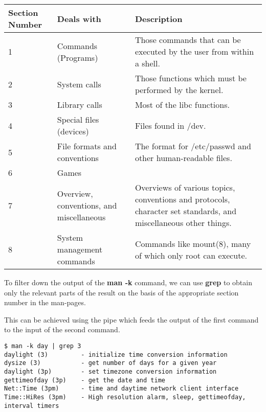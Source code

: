 \vspace{-5pt}
\noindent
\begin{tabular}{p{}p{}p{}}
	\toprule
	Section Number & Deals with & Description \\
	\midrule
	1 & Commands (Programs) & Those  commands  that  can  be executed  by the user from within a	shell. \\
	2 & System calls & Those functions which must be performed by the kernel. \\		
	3 & Library calls & Most of the libc functions. \\		
	4 & Special files (devices) & Files found in /dev. \\		
	5 & File formats and conventions & The format for /etc/passwd and other human-readable files. \\		
	6 & Games & \\		
	7 & Overview, conventions, and miscellaneous & Overviews of various topics, conventions and  protocols,  character set standards, and miscellaneous other things. \\		
	8 & System management commands & Commands like mount(8), many of which only root can execute.	\\
	\bottomrule
\end{tabular}

\noindent
To filter down the output of the \textbf{man -k} command, we can use \textbf{grep} to obtain only the relevant parts of the result on the basis of the appropriate section number in the man-pages. 

\noindent
This can be achieved using the pipe which feeds the output of the first command to the input of the second command. 

\vspace{-20pt}
\begin{verbatim}
$ man -k day | grep 3
daylight (3)         - initialize time conversion information
dysize (3)           - get number of days for a given year
daylight (3p)        - set timezone conversion information
gettimeofday (3p)    - get the date and time
Net::Time (3pm)      - time and daytime network client interface
Time::HiRes (3pm)    - High resolution alarm, sleep, gettimeofday, interval timers
\end{verbatim}

\vspace{-20pt}
\noindent

